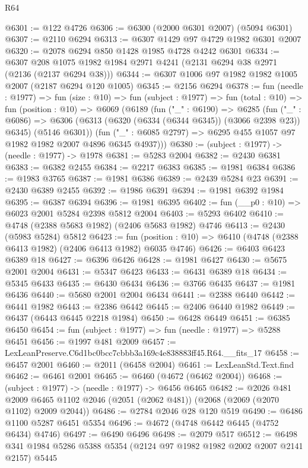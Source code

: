 \begin{lexlean}{R64}
\begin{coremodule}
@6301 := @122 @4726
@6306 := @6300 (@2000 @6301 @2007) (@5094 @6301)
@6307 := @2110 @6294
@6313 := @6307 @1429 @97 @4729 @1982 @6301 @2007
@6320 := @2078 @6294 @850 @1428 @1985 @4728 @4242 @6301
@6334 := @6307 @208 @1075 @1982 @1984 @2971 @4241 (@2131 @6294 @38 @2971 (@2136 (@2137 @6294 @38)))
@6344 := @6307 @1006 @97 @1982 @1982 @1005 @2007 (@2187 @6294 @120 @1005)
@6345 := @2156 @6294
@6378 := fun (needle : @1977) =>
  fun (size : @10) =>
  fun (subject : @1977) =>
  fun (total : @10) =>
  fun (position : @10) =>
  @6069
    (@6189
      (fun ("_" : @6190) =>
      @6285
        (fun ("_" : @6086) =>
        @6306 (@6313 (@6320 (@6334 (@6344 @6345)) (@3066 @2398 @23)) @6345) (@5146 @6301))
        (fun ("_" : @6085 @2797) => @6295 @455 @1057 @97 @1982 @1982 @2007 @4896 @6345 @4937)))
@6380 := (subject : @1977) -> (needle : @1977) -> @1978
@6381 := @5283 @2004
@6382 := @2430 @6381
@6383 := @6382 @2455
@6384 := @2217 @6383
@6385 := @1981 @6384
@6386 := @1983 @3765
@6387 := @1981 @6386
@6389 := @2439 @5284 @23
@6391 := @2430 @6389 @2455
@6392 := @1986 @6391
@6394 := @1981 @6392 @1984
@6395 := @6387 @6394
@6396 := @1981 @6395
@6402 := fun (__p0 : @10) => @6023 @2001 @5284 @2398 @5812 @2004
@6403 := @5293 @6402
@6410 := @4748 (@2388 @5683 @1982) (@2406 @5683 @1982) @4746
@6413 := @2430 (@5983 @5284) @5812
@6423 := fun (position : @10) => @6410 (@4748 (@2388 @6413 @1982) (@2406 @6413 @1982) @6035 @4746)
@6426 := @6403 @6423 @6389 @18
@6427 := @6396 @6426
@6428 := @1981 @6427
@6430 := @5675 @2001 @2004
@6431 := @5347 @6423
@6433 := @6431 @6389 @18
@6434 := @5345 @6433
@6435 := @6430 @6434
@6436 := @3766 @6435
@6437 := @1981 @6436
@6440 := @5680 @2001 @2004 @6434
@6441 := @2388 @6440
@6442 := @6441 @1982
@6443 := @2386 @6442
@6445 := @2406 @6440 @1982
@6449 := @6437 (@6443 @6445 @2218 @1984)
@6450 := @6428 @6449
@6451 := @6385 @6450
@6454 := fun (subject : @1977) => fun (needle : @1977) => @5288 @6451
@6456 := @1997 @481 @2009
@6457 := LexLeanPreserve.C6d1bc0bcc7cbbb3a169c4e838883ff45.R64.__fits_17
@6458 := @6457 @2001
@6460 := @2011 (@6458 @2004)
@6461 := LexLeanStd.Text.find
@6462 := @6461 @2001
@6465 := @6460 (@4672 (@6462 @2004))
@6468 := (subject : @1977) -> (needle : @1977) -> @6456 @6465
@6482 := @2026
    @481
    @2009
    @6465
    @1102
    @2046
    (@2051 (@2062 @481))
    (@2068 (@2069 (@2070 @1102) @2009 @2044))
@6486 := @2784 @2046 @28 @120 @519
@6490 := @6486 @1100 @5287 @6451 @5354
@6496 := @4672 (@4748 @6442 @6445 (@4752 @6434) @4746)
@6497 := @6490 @6496
@6498 := @2079 @517
@6512 := @6498 @341 @1984 @5286 @5388 @5354 (@2124 @97 @1982 @1982 @2002 @2007 @2141 @2157) @5445

\end{coremodule}
\end{lexlean}
